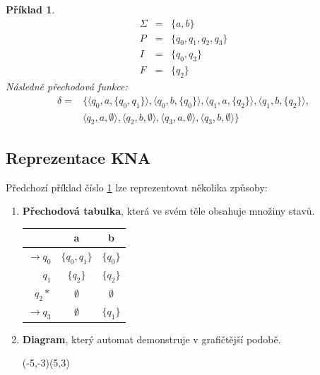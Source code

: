 \documentclass[10pt, a4paper, titlepage]{article}
\theoremstyle{note}
\newtheorem{priklad}{\textbf{Příklad}}
\begin{document}
\begin{priklad}\label{priklad-3}
\begin{eqnarray*}
\Sigma &=& \lbrace a, b \rbrace \\
P &=& \lbrace q_{0}, q_{1}, q_{2}, q_{3} \rbrace \\
I &=& \lbrace q_{0}, q_{3} \rbrace \\
F &=& \lbrace q_{2} \rbrace 
\end{eqnarray*}
Následně přechodová funkce:
\begin{eqnarray*}
\delta =&
\lbrace
\langle q_{0}, a, \lbrace q_{0},q_{1} \rbrace \rangle,
\langle q_{0}, b, \lbrace q_{0} \rbrace \rangle,
\langle q_{1}, a, \lbrace q_{2} \rbrace \rangle,
\langle q_{1}, b, \lbrace q_{2} \rbrace \rangle, \\
& \langle q_{2}, a, \emptyset \rangle,
\langle q_{2}, b, \emptyset \rangle,
\langle q_{3}, a, \emptyset \rangle,
\langle q_{3}, b, \emptyset \rangle 
\rbrace
\end{eqnarray*}
\end{priklad}

\subsection{Reprezentace KNA}
Předchozí příklad číslo \ref{priklad-3} lze reprezentovat několika způsoby:
\begin{enumerate}
\item
\textbf{Přechodová tabulka}, která ve svém těle obsahuje množiny stavů.

\begin{center}
\begin{tabular}{ r || c | c }                   
   & a & b \\
   \hline
   $ \rightarrow q_{0} $ & $ \lbrace q_{0},q_{1} \rbrace $ & $ \lbrace q_{0} \rbrace $ \\
   $ q_{1} $ & $ \lbrace q_{2} \rbrace $ & $ \lbrace q_{2} \rbrace $ \\
   $ q_{2} * $ & $ \emptyset $ & $ \emptyset $ \\
   $ \rightarrow q_{3} $ & $ \emptyset $ & $ \lbrace q_{1} \rbrace $ \\ 
\end{tabular}
\end{center}

\item
\textbf{Diagram}, který automat demonstruje v grafičtější podobě.

\begin{center}
\begin{VCPicture}{(-5,-3)(5,3)}
\end{VCPicture}
\end{center}


\end{enumerate}
\end{document}
